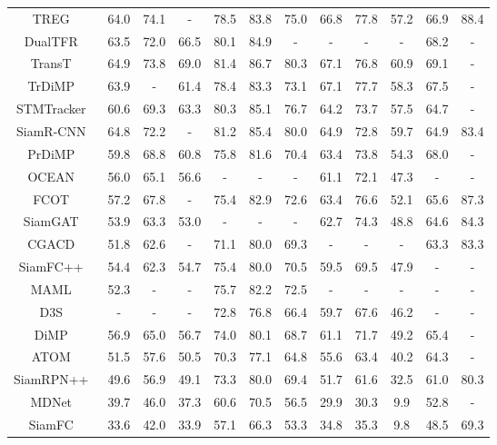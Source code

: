 \begin{table*}[ht]
{\begin{tabular}{c|ccc|ccc|ccc|cc}
    TREG~\cite{treg} & 64.0 & 74.1 & - & 78.5 & 83.8 & 75.0 & 66.8 & 77.8 & 57.2 & 66.9 & 88.4 \\
    DualTFR~\cite{dualtfr} & 63.5 & 72.0 & 66.5 & 80.1 & 84.9 & - & - & - & - & 68.2 & - \\
    TransT~\cite{transt} & 64.9 & 73.8 & 69.0 & 81.4 & 86.7 & 80.3 & 67.1 & 76.8 & 60.9 & 69.1 & - \\
    TrDiMP~\cite{tmt} & 63.9 & - & 61.4 & 78.4 & 83.3 & 73.1 & 67.1 & 77.7 & 58.3 & 67.5 & - \\
    STMTracker~\cite{stmtrack} & 60.6 & 69.3 & 63.3 & 80.3 & 85.1 & 76.7 & 64.2 & 73.7 & 57.5 & 64.7 & - \\
    SiamR-CNN~\cite{siamrcnn} & 64.8 & 72.2 & - & 81.2 & 85.4 & 80.0 & 64.9 & 72.8 & 59.7 & 64.9 & 83.4 \\
    PrDiMP~\cite{prdimp} & 59.8 & 68.8 & 60.8 & 75.8 & 81.6 & 70.4 & 63.4 & 73.8 & 54.3 & 68.0 & - \\
    OCEAN~\cite{ocean} & 56.0 & 65.1 & 56.6 & - & - & - & 61.1& 72.1 & 47.3 & - & - \\
    FCOT~\cite{fcot} & 57.2 & 67.8 & - & 75.4 & 82.9 & 72.6 & 63.4 & 76.6 & 52.1 & 65.6 & 87.3 \\
    SiamGAT~\cite{siamgat} & 53.9 & 63.3 & 53.0 & - & - & - & 62.7 & 74.3 & 48.8 & 64.6 & 84.3 \\
    CGACD~\cite{CGACD} & 51.8 & 62.6 & - & 71.1 & 80.0 & 69.3 & - & - & - & 63.3 & 83.3 \\
    SiamFC++~\cite{siamfc++} & 54.4& 62.3 & 54.7 & 75.4 & 80.0 & 70.5 & 59.5& 69.5 & 47.9 & - & - \\
    MAML~\cite{maml} & 52.3 & - & - & 75.7 & 82.2 & 72.5 & - & - & - & - & - \\
    D3S~\cite{d3s} & - & - & - & 72.8 & 76.8 & 66.4 & 59.7 & 67.6 & 46.2 & - & - \\
    DiMP~\cite{dimp} & 56.9 & 65.0 & 56.7 & 74.0 & 80.1 & 68.7 & 61.1 & 71.7 & 49.2 & 65.4 & - \\
    ATOM~\cite{atom} & 51.5 & 57.6 & 50.5 & 70.3 & 77.1 & 64.8 & 55.6 & 63.4 & 40.2 & 64.3 & - \\
    SiamRPN++~\cite{siamrpnPlus} & 49.6 & 56.9 & 49.1 & 73.3 & 80.0 & 69.4 & 51.7 & 61.6 & 32.5 & 61.0 & 80.3 \\
    MDNet~\cite{mdnet} & 39.7 & 46.0 & 37.3 & 60.6 & 70.5 & 56.5 & 29.9 & 30.3 & 9.9 & 52.8 & - \\
    SiamFC~\cite{siamfc} & 33.6 & 42.0 & 33.9 & 57.1 & 66.3 & 53.3 & 34.8 & 35.3 & 9.8 & 48.5 & 69.3 \\

\end{tabular}}
\end{table*}

